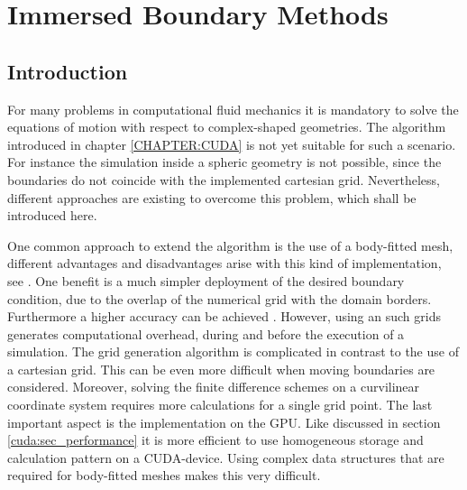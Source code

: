 \chapter{Immersed Boundary Methods}
\label{CHAPTER:IBM}

\section{Introduction}

For many problems in computational fluid mechanics it is mandatory to solve the equations of motion with respect to complex-shaped geometries.
The algorithm introduced in chapter \ref{CHAPTER:CUDA} is not yet suitable for such a scenario.
For instance the simulation inside a spheric geometry is not possible, since the boundaries
do not coincide with the implemented cartesian grid. Nevertheless,  different approaches are existing to overcome this problem,
which shall be introduced here.

One common approach to extend the algorithm is the use of a body-fitted mesh,
different advantages and disadvantages arise with this kind of implementation, see \citep{Mittal2005}.
One benefit is a much simpler deployment of the desired boundary condition, due to the overlap of the numerical grid with the domain borders.
Furthermore a higher accuracy can be achieved \citep{Gornak2013}.
However, using an such grids generates  computational overhead, during and before the execution of a simulation.
The grid generation algorithm is complicated in contrast to the use of a cartesian grid. This can be even more difficult when
moving boundaries are considered.
Moreover, solving the finite difference schemes on a curvilinear coordinate system requires more calculations for a single grid point.
The last important aspect is the implementation on the GPU.
Like discussed in section \ref{cuda:sec_performance} it is more efficient to use homogeneous storage and calculation pattern on a CUDA-device.
Using complex data structures that are required for body-fitted meshes makes this very difficult.

